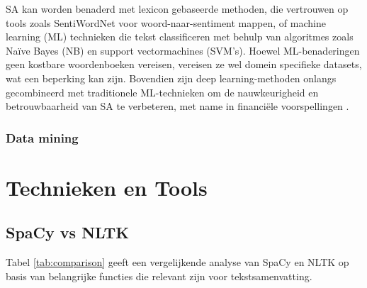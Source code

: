 SA kan worden benaderd met lexicon gebaseerde methoden, die vertrouwen op tools zoals SentiWordNet voor woord-naar-sentiment mappen, of machine learning (ML) technieken die tekst classificeren met behulp van algoritmes zoals Naïve Bayes (NB) en support vectormachines (SVM's). Hoewel ML-benaderingen geen kostbare woordenboeken vereisen, vereisen ze wel domein specifieke datasets, wat een beperking kan zijn. Bovendien zijn deep learning-methoden onlangs gecombineerd met traditionele ML-technieken om de nauwkeurigheid en betrouwbaarheid van SA te verbeteren, met name in financiële voorspellingen \autocite{Gupta2020}.

\subsubsection{Data mining}















\section{Technieken en Tools}
\subsection{SpaCy vs NLTK}
Tabel \ref{tab:comparison} geeft een vergelijkende analyse van SpaCy en NLTK op basis van belangrijke functies die relevant zijn voor tekstsamenvatting.

